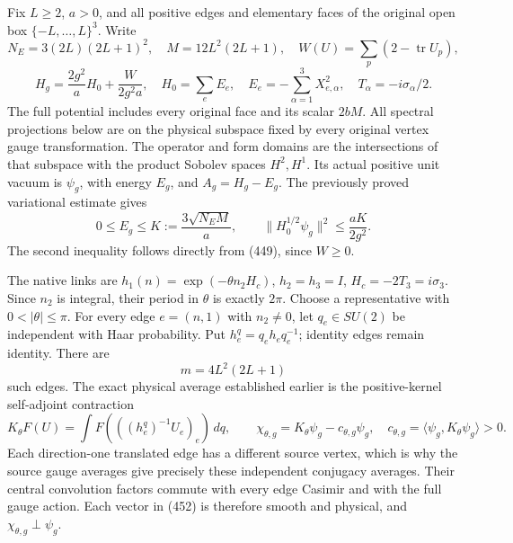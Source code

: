 \documentclass[
  11pt,
]{article}
\begin{document}
Fix \(L\ge2\), \(a>0\), and all positive edges and elementary faces of
the original open box \(\{-L,\ldots,L\}^3\). Write \[
 N_E=3(2L)(2L+1)^2,\quad M=12L^2(2L+1),\quad
 W(U)=\sum_p(2-\operatorname{tr}U_p),
\] \[
 H_g=\frac{2g^2}{a}H_0+\frac{W}{2g^2a},\quad
 H_0=\sum_eE_e,\quad E_e=-\sum_{\alpha=1}^3X_{e,\alpha}^2,
 \quad T_\alpha=-i\sigma_\alpha/2 .
 \tag{449}
\] The full potential includes every original face and its scalar
\(2bM\). All spectral projections below are on the physical subspace
fixed by every original vertex gauge transformation. The operator and
form domains are the intersections of that subspace with the product
Sobolev spaces \(H^2,H^1\). Its actual positive unit vacuum is
\(\psi_g\), with energy \(E_g\), and \(A_g=H_g-E_g\). The previously
proved variational estimate gives \[
 0\le E_g\le K:=\frac{3\sqrt{N_EM}}a,\qquad
 \|H_0^{1/2}\psi_g\|^2\le\frac{aK}{2g^2}.
 \tag{450}
\] The second inequality follows directly from (449), since \(W\ge0\).

The native links are \(h_1(n)=\exp(-\theta n_2H_c)\), \(h_2=h_3=I\),
\(H_c=-2T_3=i\sigma_3\). Since \(n_2\) is integral, their period in
\(\theta\) is exactly \(2\pi\). Choose a representative with
\(0<|\theta|\le\pi\). For every edge \(e=(n,1)\) with \(n_2\ne0\), let
\(q_e\in SU(2)\) be independent with Haar probability. Put
\(h_e^q=q_eh_eq_e^{-1}\); identity edges remain identity. There are \[
 m=4L^2(2L+1)
 \tag{451}
\] such edges. The exact physical average established earlier is the
positive-kernel self-adjoint contraction \[
 K_\theta F(U)=\int F(((h_e^q)^{-1}U_e)_e)\,dq,\qquad
 \chi_{\theta,g}=K_\theta\psi_g-c_{\theta,g}\psi_g,\quad
 c_{\theta,g}=\langle\psi_g,K_\theta\psi_g\rangle>0.
 \tag{452}
\] Each direction-one translated edge has a different source vertex,
which is why the source gauge averages give precisely these independent
conjugacy averages. Their central convolution factors commute with every
edge Casimir and with the full gauge action. Each vector in (452) is
therefore smooth and physical, and \(\chi_{\theta,g}\perp\psi_g\).
\end{document}
